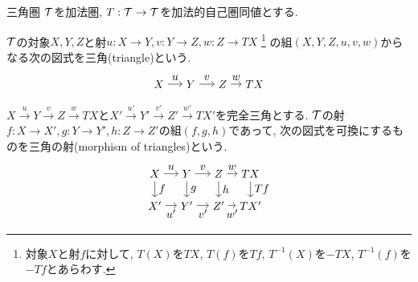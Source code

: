 \documentclass[aspectratio=169, dvipdfmx, 8pt, notheorems, uplatex]{beamer}
\begin{document}
\begin{frame}{三角圏}
  $\mathcal{T}$を加法圏, $T: \mathcal{T} \to \mathcal{T}$を加法的自己圏同値とする. 
  
  \begin{definition}[三角]
    $\mathcal{T}$の対象$X, Y, Z$と射$u: X \to Y, v: Y \to Z, w: Z \to TX$
    \footnote{
      対象$X$と射$f$に対して, $T(X)$を$TX$, $T(f)$を$Tf$, $T^{-1}(X)$を$-TX$, $T^{-1}(f)$を$-Tf$とあらわす. 
    }
    の組$(X,Y,Z,u,v,w)$からなる次の図式を三角(triangle)という. 
    \[
      \begin{tikzpicture}[auto,->]
        \node (X) at (0,1) {$X$};
        \node (Y) at (1,1) {$Y$}; 
        \node (Z) at (2,1) {$Z$}; 
        \node (TX) at (3,1) {$TX$};
        \draw (X) -- node {$u$} (Y);
        \draw (Y) -- node {$v$} (Z);
        \draw (Z) -- node {$w$} (TX);
      \end{tikzpicture}
    \]
  \end{definition} 

  \begin{definition}[三角の射]
    $X \xrightarrow{u} Y \xrightarrow{v} Z \xrightarrow{w} TX$と$X' \xrightarrow{u'} Y' \xrightarrow{v'} Z' \xrightarrow{w'} TX'$を完全三角とする. 
    $\mathcal{T}$の射$f: X \to X', g: Y \to Y', h: Z \to Z'$の組$(f,g,h)$であって, 次の図式を可換にするものを三角の射(morphism of triangles)という. 
    \[
      \begin{tikzpicture}[auto,->]
        \node (X') at (0,0) {$X'$};
        \node (Y') at (1,0) {$Y'$}; 
        \node (Z') at (2,0) {$Z'$}; 
        \node (TX') at (3,0) {$TX'$};
        \node (X) at (0,1) {$X$};
        \node (Y) at (1,1) {$Y$}; 
        \node (Z) at (2,1) {$Z$}; 
        \node (TX) at (3,1) {$TX$};
        \draw (X) -- node {$u$} (Y);
        \draw (Y) -- node {$v$} (Z);
        \draw (Z) -- node {$w$} (TX);
        \draw (X') -- node[swap] {$u'$} (Y');
        \draw (Y') -- node[swap] {$v'$} (Z');
        \draw (Z') -- node[swap] {$w'$} (TX');
        \draw (X) -- node {$f$} (X');
        \draw (Y) -- node {$g$} (Y');
        \draw (Z) -- node {$h$} (Z');
        \draw (TX) -- node {$Tf$} (TX');
      \end{tikzpicture}
    \]
  \end{definition}
\end{frame}
\end{document}
